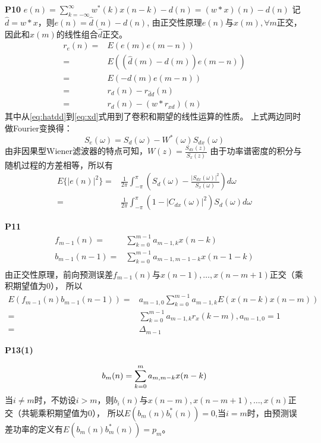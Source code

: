\documentclass{article}
\begin{document}
\textbf{P10}
$e(n)=\displaystyle\sum_{k=-\infty}^{\infty} w^*(k)x(n-k)-d(n)=(w*x)(n)-d(n)$
记$\hat{d}=w*x$，则$e(n)=\hat{d}(n)-d(n)$,
由正交性原理$e(n)$与$x(m),\forall m$正交，因此和$x(m)$的线性组合$\hat{d}$正交。
\begin{align}
r_e(n)=&E(e(m)e(m-n))\\
=& E((\hat{d}(m)-d(m))e(m-n)) \\
=& E(-d(m)e(m-n)) \\
=&r_d(n)-r_{\hat{d}d}(n)\label{eq:hatdd}\\
=&r_d(n)-(w*r_{xd})(n)\label{eq:xd}
\end{align}
其中从\eqref{eq:hatdd}到\eqref{eq:xd}式用到了卷积和期望的线性运算的性质。
上式两边同时做Fourier变换得：
\begin{equation}
S_e(\omega)=S_d(\omega)-W^*(\omega)S_{dx}(\omega)
\end{equation}
由非因果型Wiener滤波器的特点可知，$W(z)=\frac{S_{dx}(z)}{S_x(z)}$
由于功率谱密度的积分与随机过程的方差相等，所以有
\begin{align}
E\{|e(n)|^2\}=& \frac{1}{2\pi}\int_{-\pi}^{\pi}(S_d(\omega)-
\frac{|S_{dx}(\omega)|^2}{S_x(\omega)}) d\omega \\
=& \frac{1}{2\pi}\int_{-\pi}^{\pi}(1-
|C_{dx}(\omega)|^2)S_d(\omega) d\omega
\end{align}


\textbf{P11}
\begin{align}
f_{m-1}(n)=&\sum_{k=0}^{m-1} a_{m-1,k}x(n-k)\\
b_{m-1}(n-1)=&\sum_{k=0}^{m-1} a_{m-1,m-1-k}x(n-1-k)\\
\end{align}
由正交性原理，前向预测误差$f_{m-1}(n)$与$x(n-1),\dots,x(n-m+1)$正交（乘积期望值为0），
所以
\begin{align}
E(f_{m-1}(n)b_{m-1}(n-1))=&a_{m-1,0}\sum_{k=0}^{m-1} a_{m-1,k}E(x(n-k)x(n-m))\\
=& \sum_{k=0}^{m-1} a_{m-1,k}r_x(k-m),a_{m-1,0}=1\\
=& \Delta_{m-1}
\end{align}

\textbf{P13(1)}

\begin{equation}
b_{m}(n)=\sum_{k=0}^{m} a_{m,m-k}x(n-k)\\
\end{equation}
当$i\neq m$时，不妨设$i>m$，则$b_i(n)$与$x(n-m),x(n-m+1),\dots,x(n)$正交（共轭乘积期望值为0），
所以$E(b_m(n)b_i^*(n))=0$,当$i=m$时，由预测误差功率的定义有$E(b_m(n)b_m^*(n))=p_m$。
\end{document}
